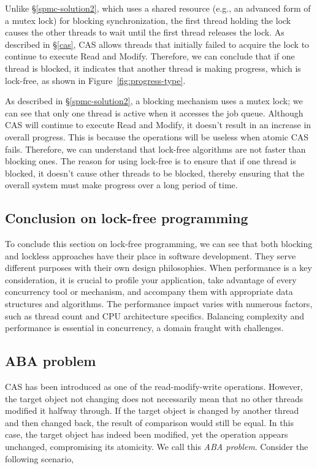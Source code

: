 \documentclass[fontsize=10pt, oneside]{scrartcl}
\newcommand{\fig}[1]{Figure~\ref{#1}}
\newcommand{\introduce}[1]{\textit{#1}}
\newcommand{\secref}[1]{\hyperref[#1]{\textsc{\S}\ref*{#1}}}
\begin{document}
Unlike \secref{spmc-solution2}, 
which uses a shared resource (e.g., an advanced form of a mutex lock) for blocking synchronization,
the first thread holding the lock causes the other threads to wait until the first thread releases the lock. 
As described in \secref{cas}, \textsc{CAS} allows threads that initially failed to acquire the lock to continue to execute Read and Modify. 
Therefore, we can conclude that if one thread is blocked, 
it indicates that another thread is making progress, 
which is lock-free, as shown in \fig{fig:progress-type}.

As described in \secref{spmc-solution2}, a blocking mechanism uses a mutex lock;
we can see that only one thread is active when it accesses the job queue. 
Although \textsc{CAS} will continue to execute Read and Modify, 
it doesn't result in an increase in overall progress. 
This is because the operations will be useless when atomic \textsc{CAS} fails. 
Therefore, we can understand that lock-free algorithms are not faster than blocking ones. 
The reason for using lock-free is to ensure that if one thread is blocked, 
it doesn't cause other threads to be blocked, 
thereby ensuring that the overall system must make progress over a long period of time.

\subsection{Conclusion on lock-free programming}
To conclude this section on lock-free programming,
we can see that both blocking and lockless approaches have their place in software development. 
They serve different purposes with their own design philosophies. 
When performance is a key consideration, it is crucial to profile your application, 
take advantage of every concurrency tool or mechanism, and accompany them with appropriate data structures and algorithms. 
The performance impact varies with numerous factors, such as thread count and CPU architecture specifics. 
Balancing complexity and performance is essential in concurrency, 
a domain fraught with challenges.

\subsection{ABA problem}
CAS has been introduced as one of the read-modify-write operations.
However, the target object not changing does not necessarily mean that no other threads modified it halfway through.
If the target object is changed by another thread and then changed back, the result of comparison would still be equal.
In this case, the target object has indeed been modified, yet the operation appears unchanged, compromising its atomicity.
We call this \introduce{ABA problem}.
Consider the following scenario,
\end{document}
